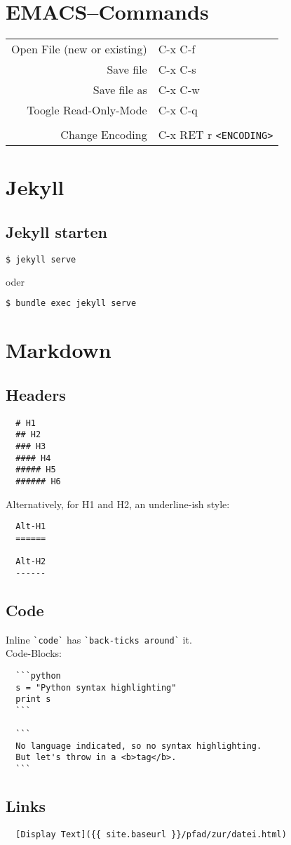 \documentclass[10pt,landscape,a4paper]{CheatSheet}
\begin{document}
\begin{multicols}{4}
  \section{EMACS--Commands}
\begin{xtabular}{rl}
  Open File (new or existing) & C-x C-f\\
  Save file & C-x C-s\\
  Save file as & C-x C-w\\
  Toogle Read-Only-Mode &C-x C-q\\
  \\
  Change Encoding & C-x RET r \texttt{<ENCODING>}\\
\end{xtabular}
\section{Jekyll}
\subsection{Jekyll starten}
\begin{lstlisting}[language=bash]
$ jekyll serve
\end{lstlisting} %
oder
\begin{lstlisting}[language=bash]
$ bundle exec jekyll serve
\end{lstlisting} %


\section{Markdown}
\subsection{Headers}
\begin{lstlisting}
  # H1
  ## H2
  ### H3
  #### H4
  ##### H5
  ###### H6
\end{lstlisting}  
 Alternatively, for H1 and H2, an underline-ish style:
\begin{lstlisting}
  Alt-H1
  ======
  
  Alt-H2
  ------
\end{lstlisting}
\subsection{Code}
Inline \lstinline{`code`} has \lstinline{`back-ticks around`} it.\\
Code-Blocks:
\begin{lstlisting}
  ```python
  s = "Python syntax highlighting"
  print s
  ```
  
  ```
  No language indicated, so no syntax highlighting. 
  But let's throw in a <b>tag</b>.
  ```
\end{lstlisting}
\subsection{Links}
\begin{lstlisting}
  [Display Text]({{ site.baseurl }}/pfad/zur/datei.html)
\end{lstlisting}
\end{multicols}
\end{document}
